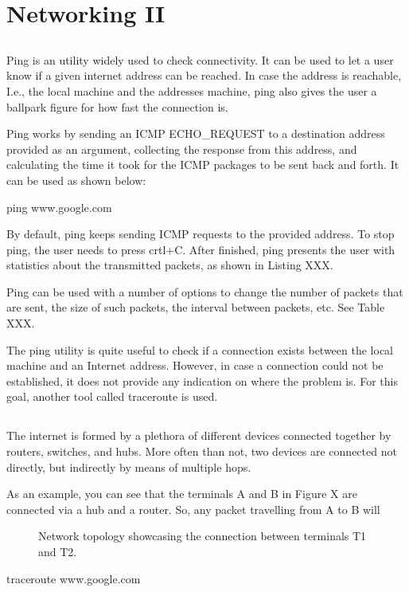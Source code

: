 \chapter{Networking II}\label{ch:networking2}

\section{}

Ping is an utility widely used to check connectivity. It can be used to let a user know if a given internet address can be reached. In case the address is reachable,  I.e., the local machine and the addresses machine, ping also gives the user a ballpark figure for how fast the connection is.

 Ping works by sending an ICMP ECHO\_REQUEST to a destination address provided as an argument, collecting the response from this address, and calculating the time it took for the ICMP packages to be sent back and forth. It can be used as shown below:
\begin{command_line}[make]
ping www.google.com
\end{command_line}


By default, ping keeps sending ICMP requests to the provided address. To stop ping, the user needs to press crtl+C. After finished, ping presents the user with statistics about the transmitted packets, as shown in Listing XXX.

Ping can be used with a number of options to change the number of packets that are sent, the size of such packets, the interval between packets, etc. See Table XXX.

The ping utility is quite useful to check if a connection exists between the local machine and an Internet address. However, in case a connection could not be established, it does not provide any indication on where the problem is. For this goal, another tool called traceroute is used.


\section{}

The internet is formed by a plethora of different devices connected together by routers, switches, and hubs. More often than not, two devices are connected not directly, but indirectly by means of multiple hops.

As an example, you can see that the terminals A and B in Figure X are connected via a hub and a router. So, any packet travelling from A to B will 

\begin{figure}[!htbp]
  \centering
        
        \caption{Network topology showcasing the connection between terminals T1 and T2.}
        \label{fig:trqceroute}
\end{figure}

\begin{command_line}[make]
traceroute www.google.com
\end{command_line}
